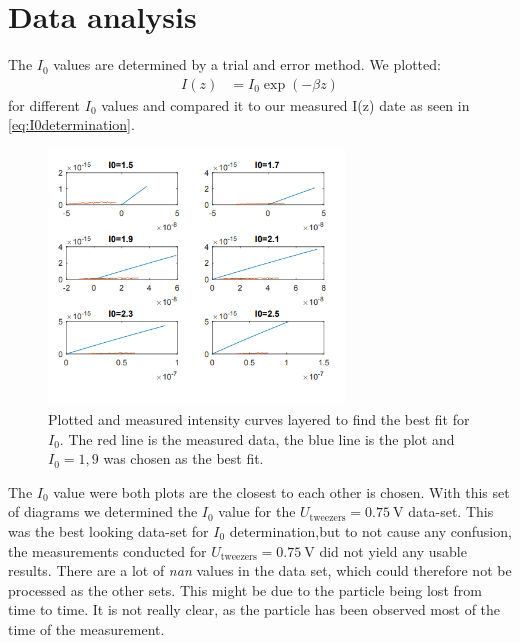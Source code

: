 \documentclass[../bericht.tex]{subfiles}
\begin{document}
    \section{Data analysis}
    \label{sec:data-analysis}

       The $I_0$ values are determined by a trial and error method.
       We plotted:
       \begin{align*}
         I(z)&=I_0 \exp\left( -\beta z \right)
       \end{align*}
       for different $I_0$ values and compared it to our measured I(z) date as seen in \cref{eq:I0determination}.

        \begin{figure}[tb]
              \centering
              \includegraphics[width=0.70\textwidth]{figures/I0determination.PNG}
              \caption{Plotted and measured intensity curves layered to find the best fit for $I_0$. The red line is the measured data, the blue line is the plot and $I_0= 1,9$ was chosen as the best fit. }
              \label{fig:I0determination}
        \end{figure}

        The $I_0$ value were both plots are the closest to each other is chosen. With this set of diagrams we determined the $I_0$ value for the $U_\mathrm{tweezers}=\SI{0,75}{\volt}$ data-set. This was the best looking data-set for $I_0$ determination,but to not cause any confusion, the measurements conducted for $U_\mathrm{tweezers}=\SI{0,75}{\volt}$ did not yield any usable results. There are a lot of \textit{nan} values in the data set, which could therefore not be processed as the other sets. This might be due to the particle being lost from time to time. It is not really clear, as the particle has been observed most of the time of the measurement.
        \medskip
\end{document}
